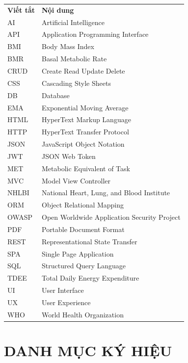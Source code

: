 \documentclass[12pt, a4paper]{report}
\begin{document}
\noindent
\begin{tabular}{>{\raggedright\arraybackslash}p{3cm} p{11cm}}
\textbf{Viết tắt} & \textbf{Nội dung} \\[0.2cm]
AI & Artificial Intelligence \\[0.15cm]
API & Application Programming Interface \\[0.15cm]
BMI & Body Mass Index \\[0.15cm]
BMR & Basal Metabolic Rate \\[0.15cm]
CRUD & Create Read Update Delete \\[0.15cm]
CSS & Cascading Style Sheets \\[0.15cm]
DB & Database \\[0.15cm]
EMA & Exponential Moving Average \\[0.15cm]
HTML & HyperText Markup Language \\[0.15cm]
HTTP & HyperText Transfer Protocol \\[0.15cm]
JSON & JavaScript Object Notation \\[0.15cm]
JWT & JSON Web Token \\[0.15cm]
MET & Metabolic Equivalent of Task \\[0.15cm]
MVC & Model View Controller \\[0.15cm]
NHLBI & National Heart, Lung, and Blood Institute \\[0.15cm]
ORM & Object Relational Mapping \\[0.15cm]
OWASP & Open Worldwide Application Security Project \\[0.15cm]
PDF & Portable Document Format \\[0.15cm]
REST & Representational State Transfer \\[0.15cm]
SPA & Single Page Application \\[0.15cm]
SQL & Structured Query Language \\[0.15cm]
TDEE & Total Daily Energy Expenditure \\[0.15cm]
UI & User Interface \\[0.15cm]
UX & User Experience \\[0.15cm]
WHO & World Health Organization \\
\end{tabular}
\clearpage

\chapter*{DANH MỤC KÝ HIỆU}
\end{document}
